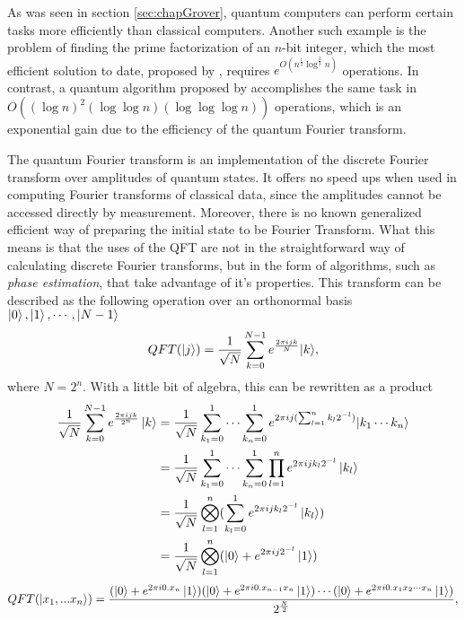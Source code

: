 \documentclass[../../dissertation.tex]{subfiles}
\begin{document}
As was seen in section \ref{sec:chapGrover}, quantum computers can perform certain tasks more efficiently than classical computers. Another such example is the problem of finding the prime factorization of an $n$-bit integer, which the most efficient solution to date, proposed by \cite{Pollard93}, requires $e^{O(n^{\frac{1}{3}}\log^{\frac{2}{3}}n)}$ operations. In contrast, a quantum algorithm proposed by \cite{Shor94} accomplishes the same task in $O((\log n)^2 (\log \log n) (\log \log \log n))$ operations, which is an exponential gain due to the efficiency of the quantum Fourier transform.\par
The quantum Fourier transform is an implementation of the discrete Fourier transform over amplitudes of quantum states. It offers no speed ups when used in computing Fourier transforms of classical data, since the amplitudes cannot be accessed directly by measurement. Moreover, there is no known generalized efficient way of preparing the initial state to be Fourier Transform. What this means is that the uses of the QFT are not in the straightforward way of calculating discrete Fourier transforms, but in the form of algorithms, such as \textit{phase estimation}, that take advantage of it's properties. This transform can be described as the following operation over an orthonormal basis $\ket{0}, \ket{1},\cdots,\ket{N-1}$
\begin{equation}
	QFT(\ket{j}) = \frac{1}{\sqrt{N}} \sum_{k=0}^{N-1} e^{\frac{2\pi i j k}{N}} {\ket{k}},
\end{equation}
where $N = 2^n$. With a little bit of algebra, this can be rewritten as a product
\begin{equation}
	\begin{split}
		\frac{1}{\sqrt{N}} \sum_{k=0}^{N-1} e^{\frac{2\pi i j k}{2^n}} \ket{k} & = 
	\frac{1}{\sqrt{N}} \sum_{k_1=0}^1 \cdots \sum_{k_n=0}^{1} e^{2\pi i j (\sum_{l=1}^{n} k_l 2^{-l})} {\ket{k_1\cdots k_n}}  \\
																 &= \frac{1}{\sqrt{N}} \sum_{k_1=0}^1 \cdots \sum_{k_n=0}^{1} \prod_{l=1}^n e^{2\pi i j k_l 2^{-l} } \ket{k_l} \\
																 &= \frac{1}{\sqrt{N}} \bigotimes_{l=1}^{n}( \sum_{k_l=0}^{1}  e^{2\pi i j k_l 2^{-l} } \ket{k_l} ) \\
																 &= \frac{1}{\sqrt{N}} \bigotimes_{l=1}^{n}( \ket{0} +  e^{2\pi i j 2^{-l} } \ket{1} )
	\end{split}
\end{equation}
\begin{equation} \label{eq:QFTCircuitRep} 
	QFT(\ket{x_1,...x_n})  =\frac{(\ket{0} + e^{2 \pi i 0.x_n} \ket{1}) (\ket{0} + e^{2 \pi i 0.x_{n-1}x_n} \ket{1})\cdots  (\ket{0} + e^{2 \pi i 0.x_1x_2\cdots x_n} \ket{1})}{2^{\frac{N}{2}}},
\end{equation}
\end{document}
